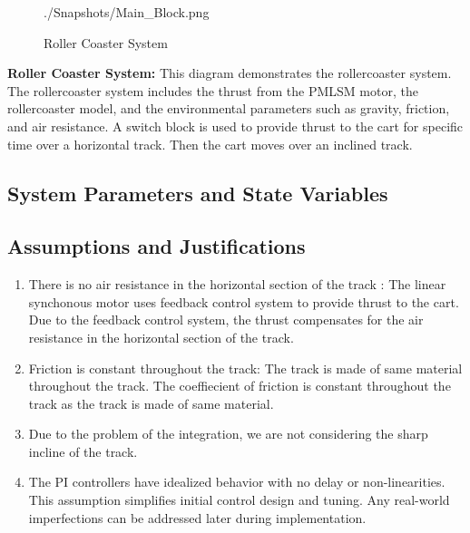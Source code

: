 \documentclass{article}
\begin{document}
\begin{itemize}
\begin{figure}[H]
{            ./Snapshots/Main_Block.png
        } %
        \caption{Roller Coaster System}
        \label{fig:Roller Coaster System}
    \end{figure}
    \textbf{Roller Coaster System:} This diagram demonstrates the rollercoaster
    system. The rollercoaster system includes the thrust from the PMLSM motor,
    the rollercoaster model, and the environmental parameters such as gravity,
    friction, and air resistance. A switch block is used to provide thrust to
    the cart for specific time over a horizontal track. Then the cart moves over
    an inclined track.

    \subsection{System Parameters and State Variables}

    \subsection{Assumptions and Justifications}
    \begin{enumerate}
        \item There is no air resistance in the horizontal section of the track :
            The linear synchonous motor uses feedback control system to provide thrust
            to the cart. Due to the feedback control system, the thrust compensates
            for the air resistance in the horizontal section of the track.

        \item Friction is constant throughout the track: The track is made of
            same material throughout the track. The coeffiecient of friction is constant
            throughout the track as the track is made of same material.

        \item Due to the problem of the integration, we are not considering the
            sharp incline of the track.

        \item The PI controllers have idealized behavior with no delay or non-linearities.
            This assumption simplifies initial control design and tuning. Any real-world
            imperfections can be addressed later during implementation.


\end{enumerate}
\end{itemize}
\end{document}
